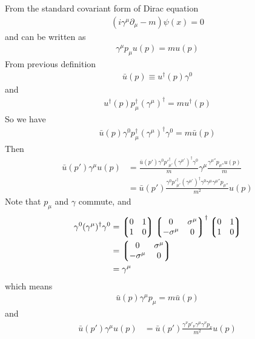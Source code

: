 \documentclass{article}
\begin{document}
From the standard covariant form of Dirac equation
\begin{align*}
  (i\gamma^{\mu}\partial_{\mu}-m)\psi(x)=0
\end{align*}
and can be written as
\begin{align}
  \gamma^{\mu}p_{\mu}u(p)=m u(p)
\end{align}
From previous definition
\begin{align*}
  \bar{u}(p)\equiv u^{\dagger}(p)\gamma^0
\end{align*}
and
\begin{align*}
  u^{\dagger}(p)p_{\mu}^{\dagger}(\gamma^{\mu})^{\dagger}=m u^{\dagger}(p)
\end{align*}
So we have
\begin{align*}
  \bar{u}(p)\gamma^0p_{\mu}^{\dagger}(\gamma^{\mu})^{\dagger}\gamma^0=m \bar{u}(p)
\end{align*}
Then
\begin{align*}
  \bar{u}(p')\gamma^{\mu}u(p)&=\frac{\bar{u}(p')\gamma^0p'_{\mu'}^{\dagger}(\gamma^{\mu'})^{\dagger}\gamma^0}{m}\gamma^{\mu}\frac{\gamma^{\mu''}p_{\mu''}u(p)}{m}\\
  &=\bar{u}(p')\frac{\gamma^0p'_{\mu'}^{\dagger}(\gamma^{\mu'})^{\dagger}\gamma^0\gamma^{\mu}\gamma^{\mu''}p_{\mu''}}{m^2}u(p)
\end{align*}
Note that $p_{\mu}$ and $\gamma$ commute, and
\begin{align*}
  \gamma^0(\gamma^{\mu})^{\dagger}\gamma^0&=\Pmqty{0&1\\1&0}\Pmqty{0&\sigma^{\mu}\\-\sigma^{\mu}&0}^{\dagger}\Pmqty{0&1\\1&0}\\
  &=\Pmqty{0&\sigma^{\mu}\\-\sigma^{\mu}&0}\\&=
  \gamma^{\mu}
\end{align*}
which means
\begin{align*}
  \bar{u}(p)\gamma^{\mu}p_{\mu}=m \bar{u}(p)
\end{align*}
and
\begin{align*}
  \bar{u}(p')\gamma^{\mu}u(p)&=\bar{u}(p')\frac{\gamma^{\nu}p'_{\nu}\gamma^{\mu}\gamma^{\nu}p_{\nu}}{m^2}u(p)
\end{align*}
\end{document}
